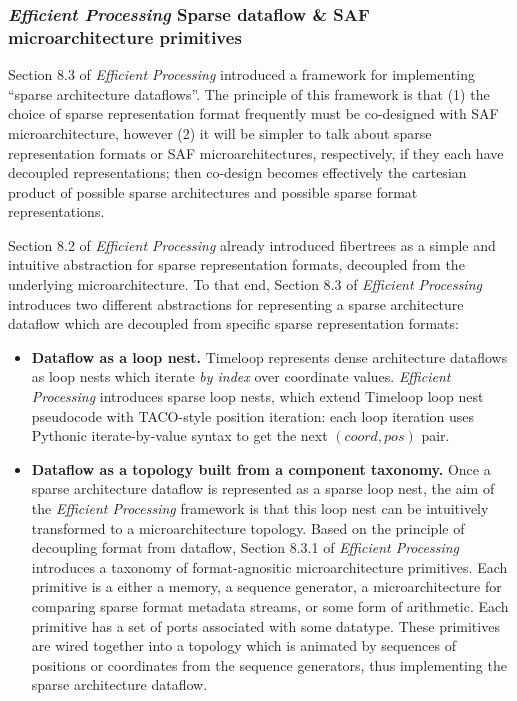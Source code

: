 \subsubsection{\textit{Efficient Processing} Sparse dataflow \& SAF microarchitecture primitives}

Section 8.3 of \textit{Efficient Processing} introduced a framework for implementing ``sparse architecture dataflows''. The principle of this framework is that (1) the choice of sparse representation format frequently must be co-designed with SAF microarchitecture, however (2) it will be simpler to talk about sparse representation formats or SAF microarchitectures, respectively, if they each have decoupled representations; then co-design becomes effectively the cartesian product of possible sparse architectures and possible sparse format representations. 

Section 8.2 of \textit{Efficient Processing} already introduced fibertrees as a simple and intuitive abstraction for sparse representation formats, decoupled from the underlying microarchitecture. To that end, Section 8.3 of \textit{Efficient Processing} introduces two different abstractions for representing a sparse architecture dataflow which are decoupled from specific sparse representation formats:

\begin{itemize}
    \item \textbf{Dataflow as a loop nest.} Timeloop\cite{timeloop} represents dense architecture dataflows as loop nests which iterate \textit{by index} over coordinate values. \textit{Efficient Processing} introduces sparse loop nests, which extend Timeloop loop nest pseudocode with TACO\cite{taco_format}-style position iteration: each loop iteration uses Pythonic iterate-by-value syntax to get the next $(coord,pos)$ pair.
    \item \textbf{Dataflow as a topology built from a component taxonomy.} Once a sparse architecture dataflow is represented as a sparse loop nest, the aim of the \textit{Efficient Processing} framework is that this loop nest can be intuitively transformed to a microarchitecture topology. Based on the principle of decoupling format from dataflow, Section 8.3.1 of \textit{Efficient Processing} introduces a taxonomy of format-agnositic microarchitecture primitives. Each primitive is a either a memory, a sequence generator, a microarchitecture for comparing sparse format metadata streams, or some form of arithmetic. Each primitive has a set of ports associated with some datatype. These primitives are wired together into a topology which is animated by sequences of positions or coordinates from the sequence generators, thus implementing the sparse architecture dataflow.
\end{itemize}

